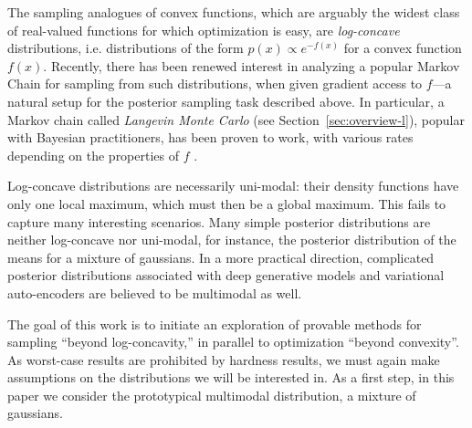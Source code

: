 The sampling analogues of convex functions, which are arguably the widest class of real-valued functions for which optimization is easy, are \emph{log-concave} distributions, i.e. distributions of the form $p(x) \propto e^{-f(x)}$ for a convex function $f(x)$. Recently, there has been renewed interest in analyzing a popular Markov Chain for sampling from such distributions, when given gradient access to $f$---a natural setup for the posterior sampling task described above. In particular, a Markov chain called \emph{Langevin Monte Carlo} (see Section~\ref{sec:overview-l}), popular with Bayesian practitioners, has been proven to work, with various rates depending on the properties of $f$ \cite{dalalyan2016theoretical, durmus2016high,dalalyan2017further}.  

Log-concave distributions are necessarily uni-modal: their density functions have only one local maximum, which must then be a global maximum. This fails to capture many interesting scenarios.
Many simple posterior distributions are neither log-concave nor uni-modal, for instance, the posterior distribution of the means for a mixture of gaussians.
In a more practical direction, complicated posterior distributions associated with deep generative models \cite{rezende2014stochastic} and variational auto-encoders \cite{kingma2013auto} are believed to be multimodal as well.  

The goal of this work is to initiate an  exploration of provable methods for sampling ``beyond log-concavity,'' in parallel to optimization ``beyond convexity''. As worst-case results are prohibited by hardness results, we must again make assumptions on the distributions we will be interested in. %
As a first step, in this paper we consider the prototypical multimodal distribution,  a mixture of gaussians. %

